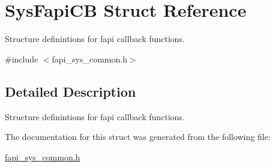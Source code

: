 \hypertarget{structSysFapiCB}{\section{Sys\-Fapi\-C\-B Struct Reference}
\label{structSysFapiCB}
}


Structure definintions for fapi callback functions.  




{\ttfamily \#include $<$fapi\-\_\-sys\-\_\-common.\-h$>$}



\subsection{Detailed Description}
Structure definintions for fapi callback functions. 

The documentation for this struct was generated from the following file\-:\begin{DoxyCompactItemize}
\item 
\hyperlink{fapi__sys__common_8h}{fapi\-\_\-sys\-\_\-common.\-h}\end{DoxyCompactItemize}
